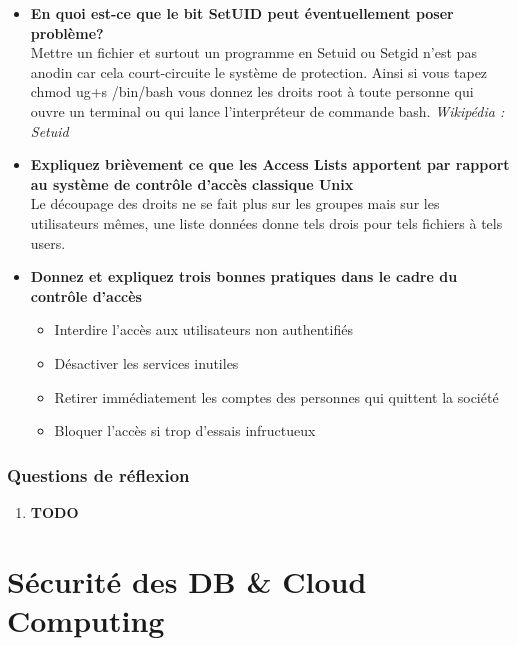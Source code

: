 \documentclass{report}
\begin{document}
\begin{itemize}
				\item \textbf{En quoi est-ce que le bit SetUID peut éventuellement poser problème?}\\

					Mettre un fichier et surtout un programme en Setuid ou Setgid n'est pas anodin car cela court-circuite le système de protection. Ainsi si vous tapez chmod ug+s /bin/bash vous donnez les droits root à toute personne qui ouvre un terminal ou qui lance l'interpréteur de commande bash. \textit{Wikipédia : Setuid}

				\item \textbf{Expliquez brièvement ce que les Access Lists apportent par rapport au système de contrôle d'accès classique Unix}\\

					Le découpage des droits ne se fait plus sur les groupes mais sur les utilisateurs mêmes, une liste données donne tels drois pour tels fichiers à tels users.\\

				\item \textbf{Donnez et expliquez trois bonnes pratiques dans le cadre du contrôle d'accès}	\\

					\begin{itemize}
						\item Interdire l'accès aux utilisateurs non authentifiés
						\item Désactiver les services inutiles
						\item Retirer immédiatement les comptes des personnes qui quittent la société
						\item Bloquer l'accès si trop d'essais infructueux
					\end{itemize}
			\end{itemize}
				

		\subsection{Questions de réflexion}

			\begin{enumerate}
				\item \textbf{TODO}
			\end{enumerate}

\chapter{Sécurité des DB \& Cloud Computing}
\end{document}

